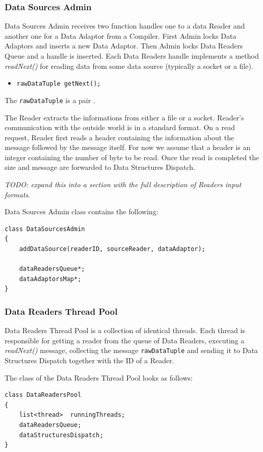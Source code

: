 \documentclass[11pt]{article}
\begin{document}
\subsubsection{Data Sources Admin}

Data Sources Admin receives two function handles one to a data Reader and another one for a Data Adaptor from a Compiler. First Admin locks Data Adaptors and inserts a new Data Adaptor. Then Admin locks Data Readers Queue  and a handle is inserted. Each Data Readers handle implements a method \emph{readNext()} for reading data from some data source (typically a socket or a file).

\begin{itemize}
	\item {\tt rawDataTuple getNext();}
\end{itemize}

\noindent The {\tt rawDataTuple} is a pair {\tt <size, bit-string>}.

The Reader extracts the informations from either a file or a socket. Reader's communication with the outside world is in a standard format. On a read request, Reader first reads a header containing the information about the message followed by the message itself. For now we assume that a header is an integer containing the number of byte to be read. Once the read is completed the size and message are forwarded to Data Structures Dispatch.

\emph{TODO: expand this into a section with the full description of Readers input formats}.

\noindent Data Sources Admin class contains the following:
\begin{verbatim}
class DataSourcesAdmin
{
    addDataSource(readerID, sourceReader, dataAdaptor);

    dataReadersQueue*;
    dataAdaptorsMap*;
}
\end{verbatim}


\subsubsection{Data Readers Thread Pool}

Data Readers Thread Pool is a collection of identical threads. Each thread is responsible for getting a reader from the queue of Data Readers, executing a \emph{readNext()} message, collecting the message {\tt rawDataTuple} and sending it to Data Structures Dispatch together with the ID of a Reader.

The class of the Data Readers Thread Pool looks as follows:
\begin{verbatim}
class DataReadersPool
{
    list<thread>  runningThreads;
    dataReadersQueue;
    dataStructuresDispatch;
}
\end{verbatim}
\end{document}
